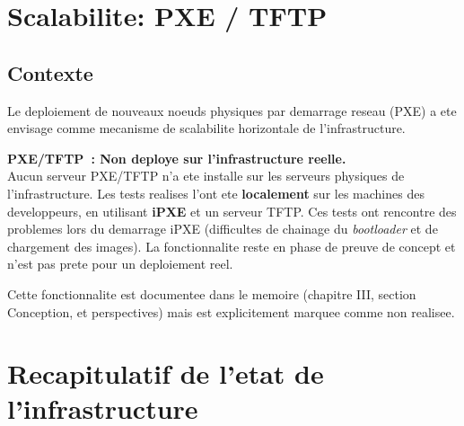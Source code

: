 \documentclass[a4paper,11pt]{article}
\newenvironment{warnbox}{%
  \begin{mdframed}[linecolor=orange,backgroundcolor=orange!8,linewidth=1pt,
    leftmargin=0pt,rightmargin=0pt,innertopmargin=6pt,innerbottommargin=6pt]
}{%
  \end{mdframed}
}
\begin{document}
\section{Scalabilite: PXE / TFTP}

\subsection{Contexte}

Le deploiement de nouveaux noeuds physiques par demarrage reseau (PXE) a ete
envisage comme mecanisme de scalabilite horizontale de l'infrastructure.

\begin{warnbox}
  \textbf{PXE/TFTP~: Non deploye sur l'infrastructure reelle.}\\
  Aucun serveur PXE/TFTP n'a ete installe sur les serveurs physiques de l'infrastructure.
  Les tests realises l'ont ete \textbf{localement} sur les machines des developpeurs,
  en utilisant \textbf{iPXE} et un serveur TFTP. Ces tests ont rencontre des problemes
  lors du demarrage iPXE (difficultes de chainage du \textit{bootloader} et de
  chargement des images). La fonctionnalite reste en phase de preuve de concept
  et n'est pas prete pour un deploiement reel.
\end{warnbox}

Cette fonctionnalite est documentee dans le memoire (chapitre III, section Conception,
et perspectives) mais est explicitement marquee comme non realisee.

\section{Recapitulatif de l'etat de l'infrastructure}
\end{document}
